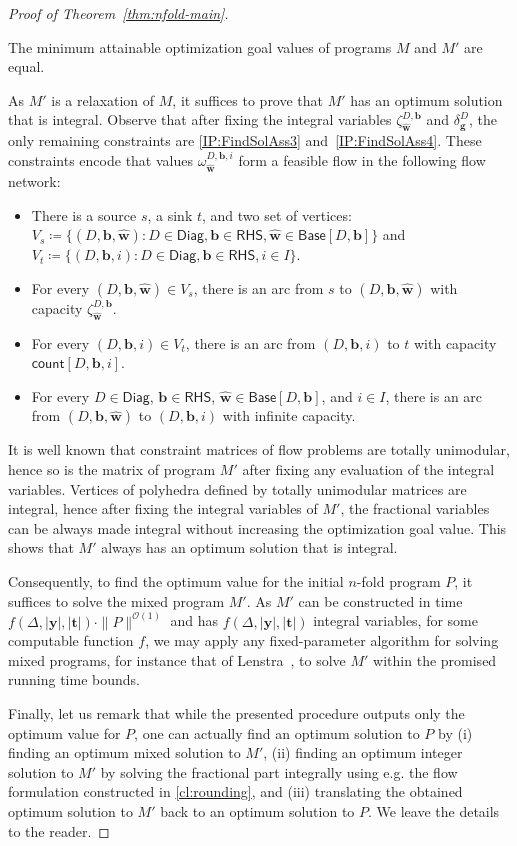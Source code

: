 \documentclass{theoretics}
\newcommand{\tup}[1]{{\mathbf{#1}}}
\newcommand{\ww}{\tup w}
\newcommand{\whww}{{\widehat{\ww}}}
\newcommand{\yy}{\tup y}
\newcommand{\tv}{\tup t}
\newcommand{\bb}{\tup b}
\renewcommand{\gg}{\tup g}
\newcommand{\Oh}{{\mathcal{O}}}
\newcommand{\RHS}{\mathsf{RHS}}
\newcommand{\Diag}{\mathsf{Diag}}
\newcommand{\Base}{\mathsf{Base}}
\newcommand{\cntTypes}{\mathsf{count}}
\begin{document}
\begin{proof}[Proof of Theorem~\ref{thm:nfold-main}]
\begin{techclaim}\label{cl:rounding}
    The minimum attainable optimization goal values of programs $M$ and $M'$ are equal.
\end{techclaim}
\begin{subproof}
As $M'$ is a relaxation of $M$, it suffices to prove that $M'$ has an optimum solution that is integral.
Observe that after fixing the integral variables $\zeta^{D,\bb}_{\whww}$ and $\delta^D_\gg$, the only remaining constraints are \cref{IP:FindSolAss3} and~\cref{IP:FindSolAss4}. These constraints encode that values $\omega^{D,\bb,i}_{\whww}$ form a feasible flow in the following flow network:
\begin{itemize}[nosep]
    \item There is a source $s$, a sink $t$, and two set of vertices: $V_s\coloneqq \{(D,\bb,\whww)\colon D\in \Diag, \bb\in \RHS, \whww\in \Base[D,\bb]\}$ and $V_t\coloneqq \{(D,\bb,i)\colon D\in \Diag, \bb\in \RHS, i\in I\}$.
    \item For every $(D,\bb,\whww)\in V_s$, there is an arc from $s$ to $(D,\bb,\whww)$ with capacity $\zeta_{\whww}^{D,\bb}$.
    \item For every $(D,\bb,i)\in V_t$, there is an arc from $(D,\bb,i)$ to $t$ with capacity $\cntTypes[D,\bb,i]$.
    \item For every $D\in \Diag$, $\bb\in \RHS$, $\whww\in \Base[D,\bb]$, and $i\in I$, there is an arc from $(D,\bb,\whww)$ to $(D,\bb,i)$ with infinite capacity.
\end{itemize}
It is well known that constraint matrices of flow problems are totally unimodular, hence so is the matrix of program $M'$ after fixing any evaluation of the integral variables. Vertices of polyhedra defined by totally unimodular matrices are integral, hence after fixing the integral variables of $M'$, the fractional variables can be always made integral without increasing the optimization goal value. This shows that $M'$ always has an optimum solution that is integral.
\end{subproof}

Consequently, to find the optimum value for the initial $n$-fold program $P$, it suffices to solve the mixed program $M'$. As $M'$ can be constructed in time $f(\Delta,|\yy|,|\tv|)\cdot \|P\|^{\Oh(1)}$ and has $f(\Delta,|\yy|,|\tv|)$ integral variables, for some computable function $f$, we may apply any fixed-parameter algorithm for solving mixed programs, for instance that of Lenstra~\cite{Lenstra1983}, to solve $M'$ within the promised running time bounds.

Finally, let us remark that while the presented procedure outputs only the optimum value for $P$, one can actually find an optimum solution to $P$ by (i) finding an optimum mixed solution to $M'$, (ii) finding an optimum integer solution to $M'$ by solving the fractional part integrally using e.g. the flow formulation constructed in \cref{cl:rounding}, and (iii) translating the obtained optimum solution to $M'$ back to an optimum solution to $P$. We leave the details to the reader.
\end{proof}
\end{document}
